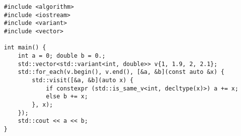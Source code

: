 \begin{lstlisting}[title=\href{https://godbolt.org/z/5vmT5f}{\texttt{godbolt.org/z/5vmT5f}}]
#include <algorithm>
#include <iostream>
#include <variant>
#include <vector>

int main() {
    int a = 0; double b = 0.;
    std::vector<std::variant<int, double>> v{1, 1.9, 2, 2.1};
    std::for_each(v.begin(), v.end(), [&a, &b](const auto &x) {
        std::visit([&a, &b](auto x) {
            if constexpr (std::is_same_v<int, decltype(x)>) a += x;
            else b += x;
        }, x);
    });
    std::cout << a << b;
}
\end{lstlisting}
